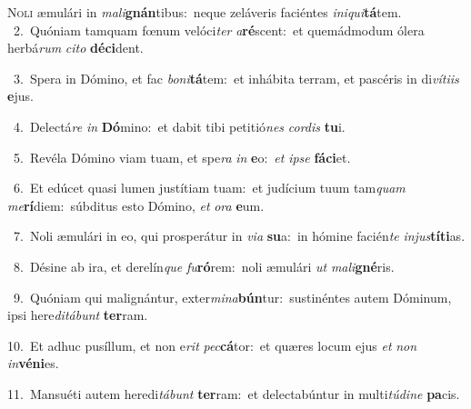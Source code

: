 \lettrine{\initial\textcolor{\initialcolor}{N}}{oli} æmulári in \textit{ma}\-\textit{li}\textbf{gnán}tibus:~\star neque zeláveris faciéntes \textit{in}\-\textit{i}\textit{qui}\textbf{tá}tem.\\
{\numbfont\textcolor{\numbcolor}{~2.}}~Quóniam tamquam fœnum velóci\textit{ter} \textit{a}\-\textbf{ré}scent:~\star et quemádmodum ólera herbá\textit{rum} \textit{ci}\-\textit{to} \textbf{dé}\-\textbf{ci}dent.\par
{\numbfont\textcolor{\numbcolor}{~3.}}~Spera in Dómino, et fac \textit{bo}\-\textit{ni}\textbf{tá}tem:~\star et inhábita terram, et pascéris in di\-\textit{ví}\-\textit{ti}\textit{is} \textbf{e}\-jus.\par
{\numbfont\textcolor{\numbcolor}{~4.}}~Delectá\textit{re} \textit{in} \textbf{Dó}\-mino:~\star et dabit tibi petitió\textit{nes} \textit{cor}\-\textit{dis} \textbf{tu}\-i.\par
{\numbfont\textcolor{\numbcolor}{~5.}}~Revéla Dómino viam tuam, et spe\textit{ra} \textit{in} \textbf{e}\-o:~\star \textit{et} \textit{ip}\-\textit{se} \textbf{fá}\-\textbf{ci}et.\par
{\numbfont\textcolor{\numbcolor}{~6.}}~Et edúcet quasi lumen justítiam tuam:~\dagger et judícium tuum tam\textit{quam} \textit{me}\-\textbf{rí}diem:~\star súbditus esto Dómino, \textit{et} \textit{o}\-\textit{ra} \textbf{e}\-um.\par
{\numbfont\textcolor{\numbcolor}{~7.}}~Noli æmulári in eo, qui prosperátur in \textit{vi}\-\textit{a} \textbf{su}\-a:~\star in hómine facién\textit{te} \textit{in}\-\textit{jus}\textbf{tí}\textbf{ti}as.\par
{\numbfont\textcolor{\numbcolor}{~8.}}~Désine ab ira, et derelín\textit{que} \textit{fu}\-\textbf{ró}rem:~\star noli æmulári \textit{ut} \textit{ma}\-\textit{li}\textbf{gné}ris.\par
{\numbfont\textcolor{\numbcolor}{~9.}}~Quóniam qui malignántur, exter\-\textit{mi}\-\textit{na}\textbf{bún}tur:~\star sustinéntes autem Dóminum, ipsi here\-\textit{di}\-\textit{tá}\textit{bunt} \textbf{ter}\-ram.\par
{\numbfont\textcolor{\numbcolor}{10.}}~Et adhuc pusíllum, et non e\textit{rit} \textit{pec}\-\textbf{cá}tor:~\star et quæres locum ejus \textit{et} \textit{non} \textit{in}\-\textbf{vé}\textbf{ni}es.\par
{\numbfont\textcolor{\numbcolor}{11.}}~Mansuéti autem heredi\-\textit{tá}\-\textit{bunt} \textbf{ter}\-ram:~\star et delectabúntur in multi\-\textit{tú}\-\textit{di}\textit{ne} \textbf{pa}\-cis.\par
